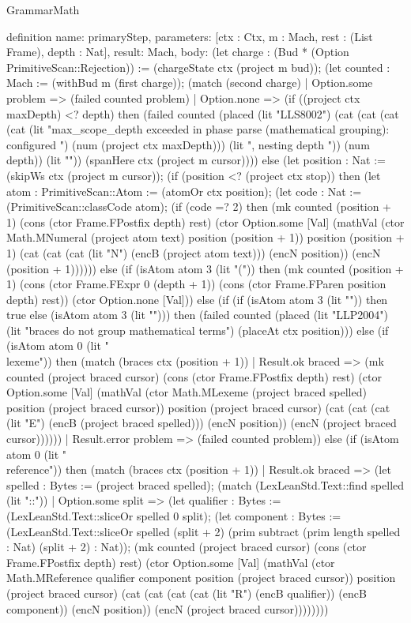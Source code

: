 \begin{lexlean}{GrammarMath}
\begin{semanticmodule}
{{{definition{
  name: primaryStep,
  parameters: [ctx : Ctx, m : Mach, rest : (List Frame), depth : Nat],
  result: Mach,
  body: (let charge : (Bud * (Option PrimitiveScan::Rejection)) := (chargeState ctx (project m bud)); (let counted : Mach := (withBud m (first charge)); (match (second charge)
    | Option.some problem => (failed counted problem)
    | Option.none => (if ((project ctx maxDepth) <? depth) then (failed counted (placed (lit "LLS8002") (cat (cat (cat (cat (lit "max_scope_depth exceeded in phase parse (mathematical grouping): configured ") (num (project ctx maxDepth))) (lit ", nesting depth ")) (num depth)) (lit "")) (spanHere ctx (project m cursor)))) else (let position : Nat := (skipWs ctx (project m cursor)); (if (position <? (project ctx stop)) then (let atom : PrimitiveScan::Atom := (atomOr ctx position); (let code : Nat := (PrimitiveScan::classCode atom); (if (code =? 2) then (mk counted (position + 1) (cons (ctor Frame.FPostfix depth) rest) (ctor Option.some [Val] (mathVal (ctor Math.MNumeral (project atom text) position (position + 1)) position (position + 1) (cat (cat (cat (lit "N") (encB (project atom text))) (encN position)) (encN (position + 1)))))) else (if (isAtom atom 3 (lit "(")) then (mk counted (position + 1) (cons (ctor Frame.FExpr 0 (depth + 1)) (cons (ctor Frame.FParen position depth) rest)) (ctor Option.none [Val])) else (if (if (isAtom atom 3 (lit "{")) then true else (isAtom atom 3 (lit "}"))) then (failed counted (placed (lit "LLP2004") (lit "braces do not group mathematical terms") (placeAt ctx position))) else (if (isAtom atom 0 (lit "\\lexeme")) then (match (braces ctx (position + 1))
      | Result.ok braced => (mk counted (project braced cursor) (cons (ctor Frame.FPostfix depth) rest) (ctor Option.some [Val] (mathVal (ctor Math.MLexeme (project braced spelled) position (project braced cursor)) position (project braced cursor) (cat (cat (cat (lit "E") (encB (project braced spelled))) (encN position)) (encN (project braced cursor))))))
      | Result.error problem => (failed counted problem)) else (if (isAtom atom 0 (lit "\\reference")) then (match (braces ctx (position + 1))
      | Result.ok braced => (let spelled : Bytes := (project braced spelled); (match (LexLeanStd.Text::find spelled (lit "::"))
        | Option.some split => (let qualifier : Bytes := (LexLeanStd.Text::sliceOr spelled 0 split); (let component : Bytes := (LexLeanStd.Text::sliceOr spelled (split + 2) (prim subtract (prim length spelled : Nat) (split + 2) : Nat)); (mk counted (project braced cursor) (cons (ctor Frame.FPostfix depth) rest) (ctor Option.some [Val] (mathVal (ctor Math.MReference qualifier component position (project braced cursor)) position (project braced cursor) (cat (cat (cat (cat (lit "R") (encB qualifier)) (encB component)) (encN position)) (encN (project braced cursor))))))))
}}}}
\end{semanticmodule}
\end{lexlean}
